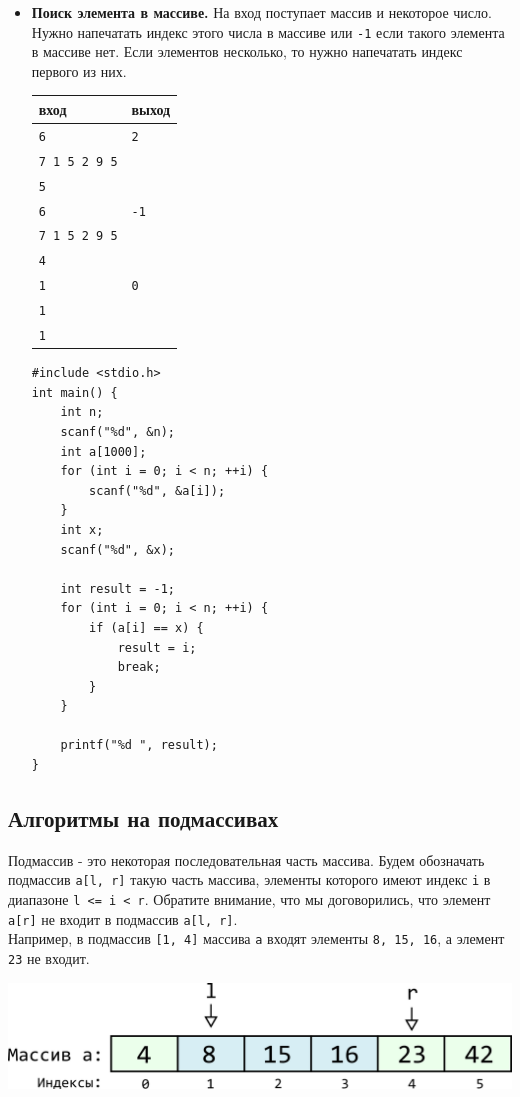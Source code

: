 \documentclass{article}
\begin{document}
\begin{itemize}
\newpage
\item \textbf{Поиск элемента в массиве.} На вход поступает массив и некоторое число. Нужно напечатать индекс этого числа в массиве или \texttt{-1} если такого элемента в массиве нет. Если элементов несколько, то нужно напечатать индекс первого из них.
\begin{center}
\begin{tabular}{ l | l }
 вход & выход \\ \hline
 \texttt{6} & \texttt{2}  \\ 
 \texttt{7 1 5 2 9 5} &   \\
 \texttt{5} &   \\ \hline

 \texttt{6} & \texttt{-1}  \\ 
 \texttt{7 1 5 2 9 5} &   \\
 \texttt{4} &   \\ \hline
 
 \texttt{1} & \texttt{0}  \\ 
 \texttt{1} &   \\
 \texttt{1} &   \\
\end{tabular}
\end{center}
\begin{lstlisting}[backgroundcolor = \color{solcolor}]
#include <stdio.h>
int main() {
    int n;
    scanf("%d", &n);
    int a[1000];
    for (int i = 0; i < n; ++i) {
        scanf("%d", &a[i]);
    }
    int x;
    scanf("%d", &x);
    
    int result = -1;
    for (int i = 0; i < n; ++i) {
        if (a[i] == x) {
            result = i;
            break;
        }
    }

    printf("%d ", result); 
}
\end{lstlisting}

\end{itemize}

\newpage
\subsection*{Алгоритмы на подмассивах}
Подмассив - это некоторая последовательная часть массива. Будем обозначать подмассив \texttt{a[l, r]} такую часть массива, элементы которого имеют индекс \texttt{i} в диапазоне \texttt{l <= i < r}. Обратите внимание, что мы договорились, что элемент \texttt{a[r]} не входит в подмассив \texttt{a[l, r]}.\\

Например, в подмассив \texttt{[1, 4]} массива \texttt{a} входят элементы \texttt{8, 15, 16}, а элемент \texttt{23} не входит.
\begin{center}
\includegraphics[scale=1]{../images/array_slice.png}
\end{center}
\end{document}
